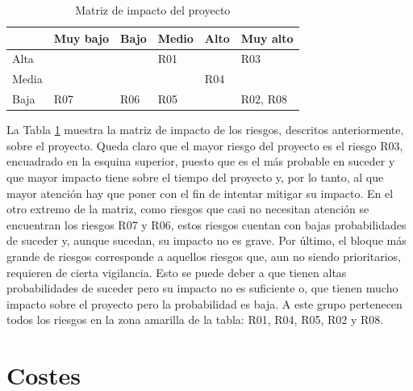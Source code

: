 \begin{table}[h]
	\centering
	\begin{tabularx}{\textwidth}{|>{\centering\arraybackslash}p{2cm}|
			>{\centering\arraybackslash}p{2cm}|
			>{\centering\arraybackslash}p{2cm}|
			>{\centering\arraybackslash}p{2cm}|
			>{\centering\arraybackslash}p{2cm}|
			>{\centering\arraybackslash}p{2cm}|}
		\hline
		& Muy bajo & Bajo & Medio & Alto & Muy alto \\ \hline
		Alta  & \cellcolor[HTML]{FFFE65} & \cellcolor[HTML]{FFFE65} & \cellcolor[HTML]{FFFE65}R01 & \cellcolor[HTML]{FD6864} & \cellcolor[HTML]{FD6864}R03 \\ \hline
		Media & \cellcolor[HTML]{32CB00} & \cellcolor[HTML]{FFFE65} & \cellcolor[HTML]{FFFE65} & \cellcolor[HTML]{FFFE65}R04 & \cellcolor[HTML]{FD6864} \\ \hline
		Baja  & \cellcolor[HTML]{32CB00}R07 & \cellcolor[HTML]{32CB00}R06 & \cellcolor[HTML]{FFFE65}R05 & \cellcolor[HTML]{FFFE65} & \cellcolor[HTML]{FFFE65}R02, R08 \\ \hline
	\end{tabularx}
	
	\vspace{0.5cm}
	\caption{Matriz de impacto del proyecto}
	\label{tab:tabla_riesgos}
\end{table}

La Tabla \ref{tab:tabla_riesgos} muestra la matriz de impacto de los riesgos, descritos anteriormente, sobre el proyecto. Queda claro que el mayor riesgo del proyecto es el riesgo R03, encuadrado en la esquina superior, puesto que es el más probable en suceder y que mayor impacto tiene sobre el tiempo del proyecto y, por lo tanto, al que mayor atención hay que poner con el fin de intentar mitigar su impacto. En el otro extremo de la matriz, como riesgos que casi no necesitan atención se encuentran los riesgos R07 y R06, estos riesgos cuentan con bajas probabilidades de suceder y, aunque sucedan, su impacto no es grave. Por último, el bloque más grande de riesgos corresponde a aquellos riesgos que, aun no siendo prioritarios, requieren de cierta vigilancia. Esto se puede deber a que tienen altas probabilidades de suceder pero su impacto no es suficiente o, que tienen mucho impacto sobre el proyecto pero la probabilidad es baja. A este grupo pertenecen todos los riesgos en la zona amarilla de la tabla: R01, R04, R05, R02 y R08.

\section{Costes}

